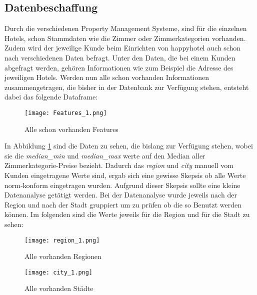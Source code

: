 \subsection{Datenbeschaffung}
\label{subsec:Datenbeschaffung}
Durch die verschiedenen Property Management Systeme, sind für die einzelnen Hotels, schon Stammdaten wie die Zimmer oder Zimmerkategorien vorhanden. Zudem wird der jeweilige Kunde beim Einrichten von happyhotel auch schon nach verschiedenen Daten befragt. Unter den Daten, die bei einem Kunden abgefragt werden, gehören Informationen wie zum Beispiel die Adresse des jeweiligen Hotels. 
\newline
\newline
Werden nun alle schon vorhanden Informationen zusammengetragen, die bisher in der Datenbank zur Verfügung stehen, entsteht dabei das folgende Dataframe:
\begin{figure}[h]
    \centering
    \texttt{[image: Features\_1.png]}
    \caption[Alle schon vorhanden Features]{Alle schon vorhanden Features}
    \label{img:all_Features}
\end{figure}

In Abbildung \ref{img:all_Features} sind die Daten zu sehen, die bislang zur Verfügung stehen, wobei sie die \emph{median\_min} und \emph{median\_max} werte auf den Median aller Zimmerkategorie-Preise bezieht.
\newline
\newline
Dadurch das \emph{region} und \emph{city} manuell vom Kunden eingetragene Werte sind, ergab sich eine gewisse Skepsis ob alle Werte norm-konform eingetragen wurden. Aufgrund dieser Skepsis sollte eine kleine Datenanalyse getätigt werden. 
\newline
\newline
Bei der Datenanalyse wurde jeweils nach der Region und nach der Stadt gruppiert um zu prüfen ob die so Benutzt werden können. Im folgenden sind die Werte jeweils für die Region und für die Stadt zu sehen:

\begin{figure}[h]
    \centering
    \texttt{[image: region\_1.png]}
    \caption[Alle vorhanden Regionen]{Alle vorhanden Regionen}
    \label{img:region_1}
\end{figure}

\begin{figure}[h]
    \centering
    \texttt{[image: city\_1.png]}
    \caption[Alle vorhanden Städte]{Alle vorhanden Städte}
    \label{img:city_1}
\end{figure}

